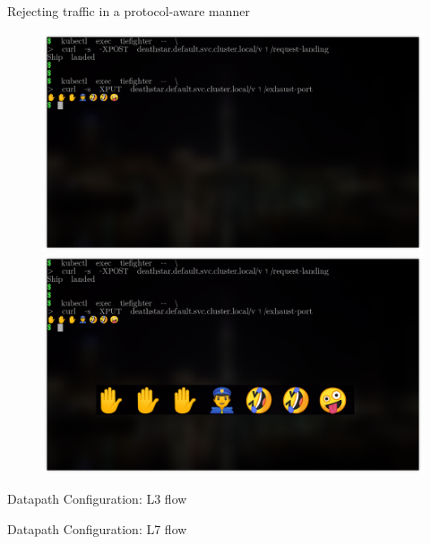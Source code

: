 \documentclass[black,white]{beamer}
\DeclareRobustCommand{\#}{\adjustbox{valign=B,totalheight=.57\baselineskip}{\oldhash}}%
\begin{document}
\begin{frame}{Rejecting traffic in a protocol-aware manner}
\begin{figure}
\begin{overprint}
            \includegraphics[width=\textwidth]{l7-deny-3.png}
            \includegraphics[width=\textwidth]{l7-deny-4.png}
        \end{overprint}
        \end{figure}
        \vfill
    \end{frame}

    \begin{frame}{Datapath Configuration: L3 flow}
        \vfill
        \begin{figure}
        \end{figure}
        \vfill
    \end{frame}

    \begin{frame}{Datapath Configuration: L7 flow}
        \vfill
        \begin{figure}
        \begin{overprint}
        \end{overprint}
        \end{figure}
        \vfill
    \end{frame}
\end{document}
